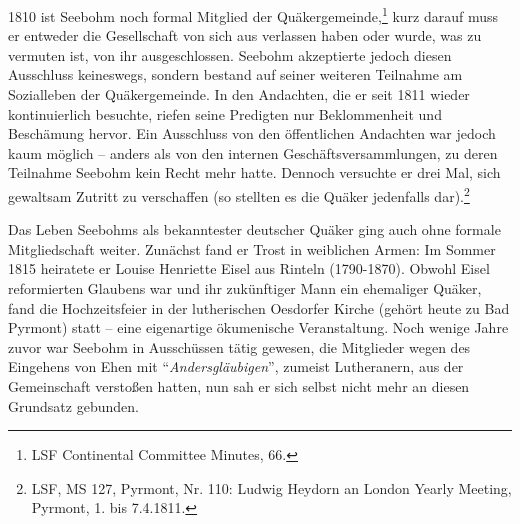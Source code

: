 \medskip

1810 ist Seebohm noch formal Mitglied der Quäkergemeinde,\footnote{LSF
Continental Committee Minutes, 66.} kurz darauf muss er entweder die
Gesellschaft von sich aus verlassen haben oder wurde, was zu vermuten ist, von
ihr ausgeschlossen. Seebohm akzeptierte jedoch diesen
Ausschluss keineswegs, sondern bestand auf seiner
weiteren Teilnahme am Sozialleben der Quäkergemeinde. In den Andachten, die er
seit 1811 wieder kontinuierlich besuchte, riefen seine Predigten nur
Beklommenheit und Beschämung hervor. Ein Ausschluss von den öffentlichen
Andachten war jedoch kaum möglich -- anders als von den internen
Geschäftsversammlungen, zu deren Teilnahme
Seebohm kein Recht mehr hatte. Dennoch versuchte er drei Mal, sich gewaltsam
Zutritt zu verschaffen (so stellten es die Quäker jedenfalls dar).\footnote{LSF,
MS 127, Pyrmont, Nr. 110: Ludwig Heydorn an London Yearly Meeting,
Pyrmont, 1. bis 7.4.1811.}

\medskip

Das Leben Seebohms als bekanntester deutscher Quäker ging auch ohne formale
Mitgliedschaft weiter. Zunächst fand er Trost in weiblichen Armen: Im Sommer
1815 heiratete er Louise Henriette Eisel aus Rinteln (1790-1870). Obwohl Eisel
reformierten Glaubens war und ihr zukünftiger Mann ein ehemaliger Quäker, fand
die Hochzeitsfeier in der lutherischen Oesdorfer Kirche (gehört heute zu Bad
Pyrmont) statt -- eine eigenartige ökumenische
Veranstaltung. Noch wenige Jahre zuvor war Seebohm in Ausschüssen tätig gewesen,
die Mitglieder wegen des Eingehens von Ehen mit
"`\textit{Andersgläubigen}"', zumeist
Lutheranern, aus der Gemeinschaft
verstoßen hatten, nun sah er sich selbst nicht mehr an diesen
Grundsatz gebunden.

\medskip

